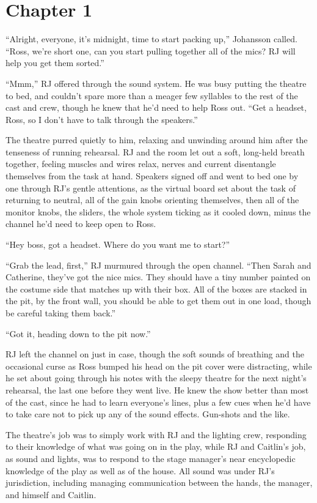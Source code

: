 \chapter{Chapter 1}

``Alright, everyone, it's midnight, time to start packing up,'' Johansson called.  ``Ross, we're short one, can you start pulling together all of the mics?  RJ will help you get them sorted.''

``Mmm,'' RJ offered through the sound system.  He was busy putting the theatre to bed, and couldn't spare more than a meager few syllables to the rest of the cast and crew, though he knew that he'd need to help Ross out.  ``Get a headset, Ross, so I don't have to talk through the speakers.''

The theatre purred quietly to him, relaxing and unwinding around him after the tenseness of running rehearsal.  RJ and the room let out a soft, long-held breath together, feeling muscles and wires relax, nerves and current disentangle themselves from the task at hand.  Speakers signed off and went to bed one by one through RJ's gentle attentions, as the virtual board set about the task of returning to neutral, all of the gain knobs orienting themselves, then all of the monitor knobs, the sliders, the whole system ticking as it cooled down, minus the channel he'd need to keep open to Ross.

``Hey boss, got a headset.  Where do you want me to start?''

``Grab the lead, first,'' RJ murmured through the open channel.  ``Then Sarah and Catherine, they've got the nice mics.  They should have a tiny number painted on the costume side that matches up with their box.  All of the boxes are stacked in the pit, by the front wall, you should be able to get them out in one load, though be careful taking them back.''

``Got it, heading down to the pit now.''

RJ left the channel on just in case, though the soft sounds of breathing and the occasional curse as Ross bumped his head on the pit cover were distracting, while he set about going through his notes with the sleepy theatre for the next night's rehearsal, the last one before they went live.  He knew the show better than most of the cast, since he had to learn everyone's lines, plus a few cues when he'd have to take care not to pick up any of the sound effects.  Gun-shots and the like.

The theatre's job was to simply work with RJ and the lighting crew, responding to their knowledge of what was going on in the play, while RJ and Caitlin's job, as sound and lights, was to respond to the stage manager's near encyclopedic knowledge of the play as well as of the house.  All sound was under RJ's jurisdiction, including managing communication between the hands, the manager, and himself and Caitlin.

